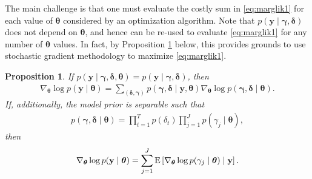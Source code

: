 \documentclass[12pt]{article}
\newcommand{\E}{\mbox{\textup{E}}}
\newcommand{\mb}[1]{\mathbf{#1}}
\newcommand{\by}{{\mb{y}}}
\newcommand{\bgamma}{{\bm{\gamma}}}
\newcommand{\bdelta}{{\bm{\delta}}}
\newcommand{\btheta}{{\bm{\theta}}}
\newcommand{\bthetaeb}{\btheta^{\textsc{eb}}}
\newcommand{\bthetaep}{\btheta^{\textsc{ep}}}
\newtheorem{prop}[thm]{Proposition}
\begin{document}
The main challenge is that one must evaluate the costly sum in \eqref{eq:marglik1} for each value of $\btheta$ considered by an optimization algorithm. 
Note that $p(\by \mid \bgamma,\bdelta)$ does not depend on $\btheta$, and hence can be re-used to evaluate \eqref{eq:marglik1} for any number of $\btheta$ values. 
In fact, by Proposition \ref{prop:one} below, this provides grounds to use stochastic gradient methodology to maximize \eqref{eq:marglik1}.
\begin{prop} \label{prop:one}
If $p(\by \mid \bgamma, \bdelta, \btheta) = p(\by \mid \bgamma, \bdelta)$, then
\begin{align*}
\nabla_{\btheta} \log p(\by \mid \btheta) = \sum_{(\bdelta, \bgamma)} p(\bgamma, \bdelta \mid \by, \btheta) \nabla_{\btheta} \log p(\bgamma, \bdelta \mid \btheta).
\end{align*}
If, additionally, the model prior is separable such that
\begin{align*}
p(\bgamma, \bdelta \mid \btheta) = \prod_{t=1}^{T} p(\delta_{t}) \prod_{j=1}^{J} p(\gamma_{j} \mid \btheta),
\end{align*}
then
\begin{align}
\nabla_{\btheta} \log p(\by \mid \btheta) = \sum_{j=1}^{J} \E\left[ \nabla_{\btheta} \log p(\gamma_{j} \mid \btheta) \mid \by \right]. \label{eq:prop_one}
\end{align}
\end{prop}
\end{document}
